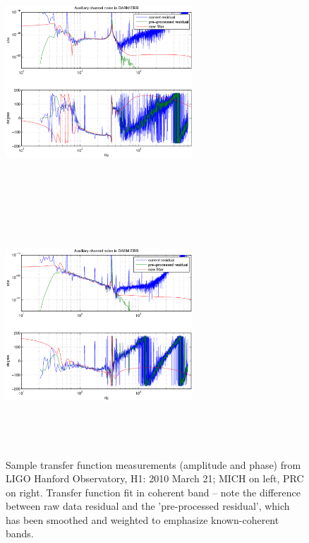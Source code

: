 \begin{figure}
\begin{center}
\includegraphics[height=90mm, width=70mm]{figure3a.eps}
\includegraphics[height=90mm, width=70mm]{figure3b.eps}
\caption{Sample transfer function measurements (amplitude and phase) from LIGO Hanford Observatory, H1: 2010 March 21; MICH on left, PRC on right. Transfer function fit in coherent band -- note the difference between raw data residual and the 'pre-processed residual', which has been smoothed and weighted to emphasize known-coherent bands.}
\label{tfGraph}
\end{center}
\end{figure}
